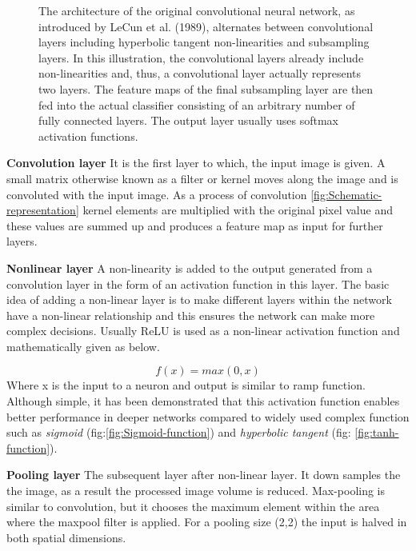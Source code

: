 \begin{figure}[H]
	\caption[Architecture of a traditional convolutional neural network.]{\protect\cite{davidstutz2016} The architecture of the original convolutional neural network, as introduced by LeCun et al. (1989), alternates between convolutional layers including hyperbolic tangent non-linearities and subsampling layers. In this illustration, the convolutional layers already include non-linearities and, thus, a convolutional layer actually represents two layers. The feature maps of the final subsampling layer are then fed into the actual classifier consisting of an arbitrary number of fully connected layers. The output layer usually uses softmax activation functions.}
	\label{fig:traditional-convolutional-network}
\end{figure}

\newpara \textbf{Convolution layer} It is the first layer to which, the input image is given. A small matrix otherwise known as a filter or kernel moves along the image and is convoluted with the input image. As a process of convolution \ref{fig:Schematic-representation} kernel elements are multiplied with the original pixel value and these values are summed up and produces a feature map as input for further layers.
 
\newpara \textbf{Nonlinear layer}
A non-linearity is added to the output generated from a convolution layer in the form of an activation function in this layer. The basic idea of adding a non-linear layer is to make different layers within the network have a non-linear relationship and this ensures the network can make more complex decisions.
Usually ReLU is used as a non-linear activation function and mathematically given as below.

\begin{equation}
	f(x) =max(0, x)
\end {equation}
Where x is the input to a neuron and output is similar to ramp function.
Although simple, it has been demonstrated that this activation function enables better performance in deeper networks compared to widely used complex function such as \textit{sigmoid} (fig:\ref{fig:Sigmoid-function}) and \textit{hyperbolic tangent} (fig: \ref{fig:tanh-function}).

\newpara \textbf{Pooling layer}
The subsequent layer after non-linear layer. It down samples the the image, as a result the processed image volume is reduced. Max-pooling is similar to convolution, but it chooses the maximum element within the area where the maxpool filter is applied. For a pooling size (2,2) the input is halved in both spatial dimensions.

